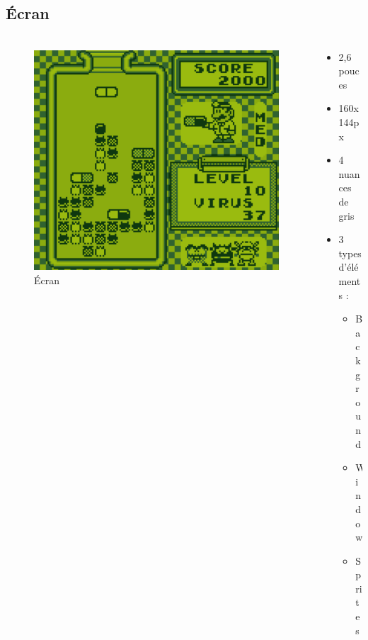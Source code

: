 \documentclass{beamer}
\begin{document}

\subsection{Écran}
\begin{frame}
	\frametitle{\secname}
  \framesubtitle{\subsecname}
  \begin{columns}[T]
		\begin{column}{.30\textwidth}
			\begin{figure}
				\includegraphics[width=1\textwidth]{images/screen.png}
				\caption{Écran}
			\end{figure}
		\end{column}
		\begin{column}{.70\textwidth}
      \begin{itemize}
        \item 2,6 pouces
        \item 160x144px
        \item 4 nuances de gris
        \item 3 types d'éléments :
        \begin{itemize}
          \item Background
          \item Window
          \item Sprites
        \end{itemize}
      \end{itemize}
		\end{column}
	\end{columns}
\end{frame}
\end{document}
